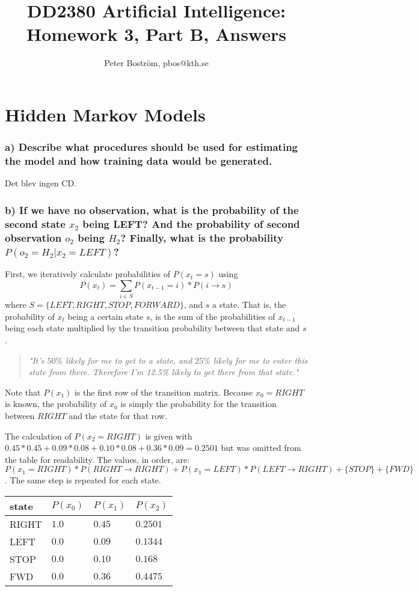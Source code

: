 \documentclass[a4paper] {article}
\title {DD2380 Artificial Intelligence:\\
	Homework 3, Part B, Answers}
\author {Peter Boström, pbos@kth.se}
\begin{document}
\maketitle

\section*{Hidden Markov Models}
	\subsubsection*{a) Describe what procedures should be used for estimating the model and how training data would be generated.}

		Det blev ingen CD.

	\subsubsection*{b) If we have no observation, what is the probability of the second state $x_2$ being LEFT? And the probability of second observation $o_2$ being $H_2$? Finally, what is the probability $P(o_2 = H_2|x_2 = LEFT)$?}

		First, we iteratively calculate probabilities of $P(x_t=s)$ using $$P(x_t) = \sum_{i \in S}{P(x_{t-1}=i)*P(i\rightarrow s)}$$ where $S = \{LEFT, RIGHT, STOP, FORWARD\}$, and $s$ a state.
		That is, the probability of $x_t$ being a certain state $s$, is the sum of the probabilities of $x_{t-1}$ being each state multiplied by the transition probability between that state and $s$.

		\begin{quote} \emph{"It's $50\%$ likely for me to get to a state, and $25\%$ likely for me to enter this state from there. Therefore I'm 12.5\% likely to get there from that state."} \end{quote}

		Note that $P(x_1)$ is the first row of the transition matrix. Because $x_0=RIGHT$ is known, the probability of $x_0$ is simply the probability for the transition between $RIGHT$ and the state for that row.

		The calculation of $P(x_2=RIGHT)$ is given with $0.45*0.45+0.09*0.08+0.10*0.08+0.36*0.09 = 0.2501 $ but was omitted from the table for readability. The values, in order, are: $P(x_1 = RIGHT)*P(RIGHT\rightarrow RIGHT) + P(x_1 = LEFT)*P(LEFT\rightarrow RIGHT) + \{STOP\} + \{FWD\}$. The same step is repeated for each state.
		\begin{center}
		\begin{tabular}{|l||l|l|l|}
			\hline
			state & $P(x_0)$ & $P(x_1)$ & $P(x_2)$ \\
			\hline
			\hline
			RIGHT & $1.0$ & $0.45$ & $0.2501$ \\
			LEFT & $0.0$ & $0.09$ & $0.1344$ \\
			STOP & $0.0$ & $0.10$ & $0.168$ \\
			FWD & $0.0$ & $0.36$ & $0.4475$ \\
			\hline
		\end{tabular}
		\end{center}
\end{document}
